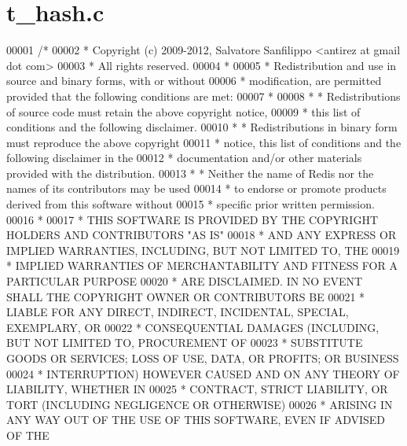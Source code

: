 \hypertarget{t__hash_8c_source}{}\section{t\+\_\+hash.\+c}
\label{t__hash_8c_source}

\begin{DoxyCode}
00001 \textcolor{comment}{/*}
00002 \textcolor{comment}{ * Copyright (c) 2009-2012, Salvatore Sanfilippo <antirez at gmail dot com>}
00003 \textcolor{comment}{ * All rights reserved.}
00004 \textcolor{comment}{ *}
00005 \textcolor{comment}{ * Redistribution and use in source and binary forms, with or without}
00006 \textcolor{comment}{ * modification, are permitted provided that the following conditions are met:}
00007 \textcolor{comment}{ *}
00008 \textcolor{comment}{ *   * Redistributions of source code must retain the above copyright notice,}
00009 \textcolor{comment}{ *     this list of conditions and the following disclaimer.}
00010 \textcolor{comment}{ *   * Redistributions in binary form must reproduce the above copyright}
00011 \textcolor{comment}{ *     notice, this list of conditions and the following disclaimer in the}
00012 \textcolor{comment}{ *     documentation and/or other materials provided with the distribution.}
00013 \textcolor{comment}{ *   * Neither the name of Redis nor the names of its contributors may be used}
00014 \textcolor{comment}{ *     to endorse or promote products derived from this software without}
00015 \textcolor{comment}{ *     specific prior written permission.}
00016 \textcolor{comment}{ *}
00017 \textcolor{comment}{ * THIS SOFTWARE IS PROVIDED BY THE COPYRIGHT HOLDERS AND CONTRIBUTORS "AS IS"}
00018 \textcolor{comment}{ * AND ANY EXPRESS OR IMPLIED WARRANTIES, INCLUDING, BUT NOT LIMITED TO, THE}
00019 \textcolor{comment}{ * IMPLIED WARRANTIES OF MERCHANTABILITY AND FITNESS FOR A PARTICULAR PURPOSE}
00020 \textcolor{comment}{ * ARE DISCLAIMED. IN NO EVENT SHALL THE COPYRIGHT OWNER OR CONTRIBUTORS BE}
00021 \textcolor{comment}{ * LIABLE FOR ANY DIRECT, INDIRECT, INCIDENTAL, SPECIAL, EXEMPLARY, OR}
00022 \textcolor{comment}{ * CONSEQUENTIAL DAMAGES (INCLUDING, BUT NOT LIMITED TO, PROCUREMENT OF}
00023 \textcolor{comment}{ * SUBSTITUTE GOODS OR SERVICES; LOSS OF USE, DATA, OR PROFITS; OR BUSINESS}
00024 \textcolor{comment}{ * INTERRUPTION) HOWEVER CAUSED AND ON ANY THEORY OF LIABILITY, WHETHER IN}
00025 \textcolor{comment}{ * CONTRACT, STRICT LIABILITY, OR TORT (INCLUDING NEGLIGENCE OR OTHERWISE)}
00026 \textcolor{comment}{ * ARISING IN ANY WAY OUT OF THE USE OF THIS SOFTWARE, EVEN IF ADVISED OF THE}

\end{DoxyCode}

